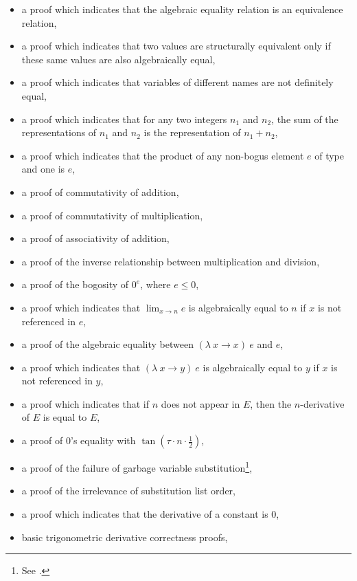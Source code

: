 \documentclass{report}
\begin{document}
\begin{itemize}
 \item a proof which indicates that the algebraic equality relation is an equivalence relation,
 \item a proof which indicates that two values are structurally equivalent only if these same values are also algebraically equal,
 \item a proof which indicates that variables of different names are not definitely equal,
 \item a proof which indicates that for any two integers \(n_1\) and \(n_2\), the sum of the representations of \(n_1\) and \(n_2\) is the representation of \(n_1 + n_2\),
 \item a proof which indicates that the product of any non-bogus element \(e\) of type  and one is \(e\),
 \item a proof of commutativity of addition,
 \item a proof of commutativity of multiplication,
 \item a proof of associativity of addition,
 \item a proof of the inverse relationship between multiplication and division,
 \item a proof of the bogosity of \(0^e\), where \(e \leq 0\),
 \item a proof which indicates that \(\lim_{x \rightarrow n} e\) is algebraically equal to \(n\) if \(x\) is not referenced in \(e\),
 \item a proof of the algebraic equality between \(\left(\lambda\ x \rightarrow x\right)\ e\) and \(e\),
 \item a proof which indicates that \(\left(\lambda\ x \rightarrow y\right)\ e\) is algebraically equal to \(y\) if \(x\) is not referenced in \(y\),
 \item a proof which indicates that if \(n\) does not appear in \(E\), then the \(n\)-derivative of \(E\) is equal to \(E\),
 \item a proof of \(0\)'s equality with \(\tan \left(\tau \cdot n \cdot \frac12\right)\),
 \item a proof of the failure of garbage variable substitution\footnote{See .},
 \item a proof of the irrelevance of substitution list order,
 \item a proof which indicates that the derivative of a constant is \(0\),
 \item basic trigonometric derivative correctness proofs,

\end{itemize}
\end{document}
